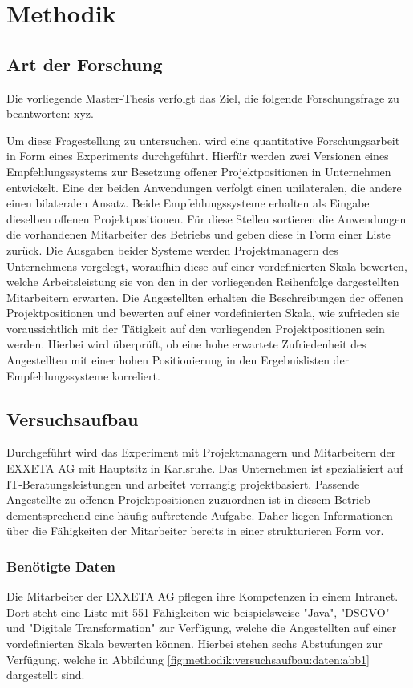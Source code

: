 \chapter{Methodik}
\label{ch:methodik}

\section{Art der Forschung}
\label{ch:methodik:art}
Die vorliegende Master-Thesis verfolgt das Ziel, die folgende Forschungsfrage zu beantworten: xyz.

Um diese Fragestellung zu untersuchen, wird eine quantitative Forschungsarbeit in Form eines Experiments durchgeführt. Hierfür werden zwei Versionen eines Empfehlungssystems zur Besetzung offener Projektpositionen in Unternehmen entwickelt. Eine der beiden Anwendungen verfolgt einen unilateralen, die andere einen bilateralen Ansatz. Beide Empfehlungssysteme erhalten als Eingabe dieselben offenen Projektpositionen. Für diese Stellen sortieren die Anwendungen die vorhandenen Mitarbeiter des Betriebs und geben diese in Form einer Liste zurück. Die Ausgaben beider Systeme werden Projektmanagern des Unternehmens vorgelegt, woraufhin diese auf einer vordefinierten Skala bewerten, welche Arbeitsleistung sie von den in der vorliegenden Reihenfolge dargestellten Mitarbeitern erwarten. Die Angestellten erhalten die Beschreibungen der offenen Projektpositionen und bewerten auf einer vordefinierten Skala, wie zufrieden sie voraussichtlich mit der Tätigkeit auf den vorliegenden Projektpositionen sein werden. Hierbei wird überprüft, ob eine hohe erwartete Zufriedenheit des Angestellten mit einer hohen Positionierung in den Ergebnislisten der Empfehlungssysteme korreliert.

\section{Versuchsaufbau}
\label{ch:methodik:versuchsaufbau}
Durchgeführt wird das Experiment mit Projektmanagern und Mitarbeitern der EXXETA AG mit Hauptsitz in Karlsruhe. Das Unternehmen ist spezialisiert auf IT-Beratungsleistungen und arbeitet vorrangig projektbasiert. Passende Angestellte zu offenen Projektpositionen zuzuordnen ist in diesem Betrieb dementsprechend eine häufig auftretende Aufgabe. Daher liegen Informationen über die Fähigkeiten der Mitarbeiter bereits in einer strukturieren Form vor.

\subsection{Benötigte Daten}
\label{ch:methodik:versuchsaufbau:daten}
Die Mitarbeiter der EXXETA AG pflegen ihre Kompetenzen in einem Intranet. Dort steht eine Liste mit 551 Fähigkeiten wie beispielsweise "Java", "DSGVO" und "Digitale Transformation" zur Verfügung, welche die Angestellten auf einer vordefinierten Skala bewerten können. Hierbei stehen sechs Abstufungen zur Verfügung, welche in Abbildung \ref{fig:methodik:versuchsaufbau:daten:abb1} dargestellt sind.

